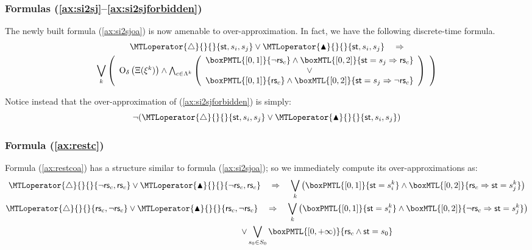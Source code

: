 \documentclass[a4paper]{article}
\newcommand{\frf}[1]{(\ref{#1})}
\newcommand{\fsrf}[2]{(\ref{#1}--\ref{#2})}
\newcommand{\overap}[1]{\mathrm{O}_{\delta}\left({#1}\right)}
\newcommand{\st}{\mathsf{st}}
\newcommand{\rest}[1]{\mathsf{rs}_{#1}}
\newcommand{\becomesMTL}[1]{\MTLoperator{\triangle}{}{}{#1}}
\newcommand{\becomesOMTL}[1]{\MTLoperator{\blacktriangle}{}{}{#1}}
\theoremstyle{plain}
\theoremstyle{definition}
\begin{document}
\subsubsection{Formulas \fsrf{ax:si2sj}{ax:si2sjforbidden}}
The newly built formula \frf{ax:si2sjoa} is now amenable to over-ap\-prox\-i\-ma\-tion.
In fact, we have the following discrete-time formula.
\begin{multline} \label{ax:si2sj-overap}
   \becomesMTL{\st, s_i, s_j} \vee  \becomesOMTL{\st, s_i, s_j} 
   \quad \Rightarrow \\ \bigvee_k \left( \begin{array}{c}
       \overap{\Xi(\xi^k)} \wedge 
         \bigwedge_{c \in \Lambda^k} \left( \begin{array}{c}
             \boxPMTL{[0,1]}{\neg \rest{c}} \wedge \boxMTL{[0,2]}{\st = s_j \Rightarrow \rest{c}} \\
             \vee \\
             \boxPMTL{[0,1]}{\rest{c}} \wedge \boxMTL{[0,2]}{\st = s_j \Rightarrow \neg \rest{c}}
             \end{array} \right)
          \end{array} \right)
\end{multline}


Notice instead that the over-ap\-prox\-i\-ma\-tion of \frf{ax:si2sjforbidden} is simply:
\begin{equation} \label{ax:si2sjforbidden-overap}
  \neg ( \becomesMTL{\st, s_i, s_j} \vee \becomesOMTL{\st, s_i, s_j})
\end{equation}








\subsubsection{Formula \frf{ax:restc}}
Formula \frf{ax:restcoa} has a structure similar to formula \frf{ax:si2sjoa}; so we immediately compute its over-ap\-prox\-i\-ma\-tions as:
\begin{gather}
  \becomesMTL{\neg \rest{c}, \rest{c}} \vee \becomesOMTL{\neg \rest{c}, \rest{c}} \quad \Rightarrow \quad 
    \bigvee_k \left( \boxPMTL{[0,1]}{\st = s_i^k} \wedge \boxMTL{[0,2]}{\rest{c} \Rightarrow \st = s_j^k} \right)
    \nonumber \\
  \becomesMTL{\rest{c}, \neg \rest{c}} \vee \becomesOMTL{\rest{c}, \neg \rest{c}} \quad \Rightarrow \quad 
    \bigvee_k \left( \boxPMTL{[0,1]}{\st = s_i^k} \wedge \boxMTL{[0,2]}{\neg \rest{c} \Rightarrow \st = s_j^k} \right) \nonumber \\
    \qquad \qquad \qquad \qquad \qquad \qquad \vee \bigvee_{s_0 \in S_0} \boxPMTL{[0, +\infty)}{\rest{c} \wedge \st = s_0}
       \label{ax:restc-overap}
\end{gather}
\end{document}
